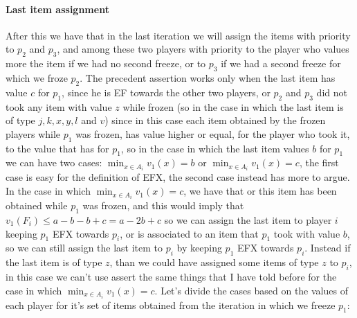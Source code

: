 \documentclass{article}
\begin{document}
\paragraph{Last item assignment}
After this we have that in the last iteration we will assign the items with priority to $p_2$ and $p_3$, and among these two players with priority to the player who values more the item if we had no second freeze, or to $p_3$ if we had a second freeze for which we froze $p_2$. The precedent assertion works only when the last item has value $c$ for $p_1$, since he is EF towards the other two players, or $p_2$ and $p_3$ did not took any item with value $z$ while frozen (so in the case in which the last item is of type $j, k, x, y, l$ and $v$) since in this case each item obtained by the frozen players while $p_1$ was frozen, has value higher or equal, for the player who took it, to the value that has for $p_1$, so in the case in which the last item values $b$ for $p_1$ we can have two cases: $\min_{x\in A_i} v_1(x) = b$ or $\min_{x\in A_i} v_1(x) = c$, the first case is easy for the definition of EFX, the second case instead has more to argue. In the case in which  $\min_{x\in A_i} v_1(x) = c$, we have that or this item has been obtained while $p_1$ was frozen, and this would imply that $v_1(F_i) \le a - b - b + c = a-2b+c$ so we can assign the last item to player $i$ keeping $p_1$ EFX towards $p_i$, or is associated to an item that $p_1$ took with value $b$, so we can still assign the last item to $p_i$ by keeping $p_1$ EFX towards $p_i$. Instead if the last item is of type $z$, than we could have assigned some items of type $z$ to $p_i$, in this case we can't use assert the same things that I have told before for the case in which $\min_{x\in A_i} v_1(x) = c$.  Let's divide the cases based on the values of each player for it's set of items obtained from the iteration in which we freeze $p_1$:
\end{document}
